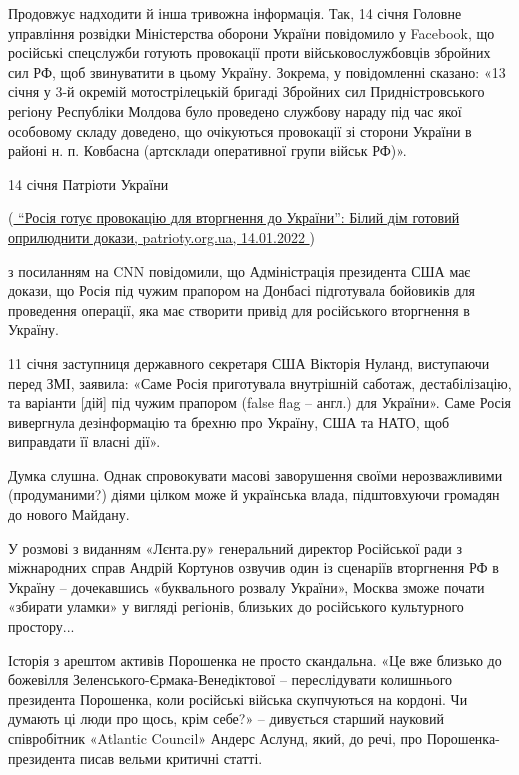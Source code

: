 Продовжує надходити й інша тривожна інформація. Так, 14 січня Головне
управління розвідки Міністерства оборони України повідомило у Facebook, що
російські спецслужби готують провокації проти військовослужбовців збройних сил
РФ, щоб звинуватити в цьому Україну. Зокрема, у повідомленні сказано: «13 січня
у 3-й окремій мотострілецькій бригаді Збройних сил Придністровського регіону
Республіки Молдова було проведено службову нараду під час якої особовому складу
доведено, що очікуються провокації зі сторони України в районі н. п. Ковбасна
(артсклади оперативної групи військ РФ)».

14 січня Патріоти України

(\href{https://patrioty.org.ua/politic/rosiia-hotuie-provokatsiiu-dlia-vtorhnennia-do-ukrainy-bilyi-dim-hotovyi-opryliudnyty-dokazy-406573.html}{
\enquote{Росія готує провокацію для вторгнення до України}: Білий дім готовий оприлюднити докази, patrioty.org.ua, 14.01.2022%
})

з посиланням на CNN повідомили, що Адміністрація президента США має докази, що
Росія під чужим прапором на Донбасі підготувала бойовиків для проведення
операції, яка має створити привід для російського вторгнення в Україну.

11 січня заступниця державного секретаря США Вікторія Нуланд, виступаючи перед
ЗМІ, заявила: «Саме Росія приготувала внутрішній саботаж, дестабілізацію, та
варіанти [дій] під чужим прапором (false flag – англ.) для України». Саме Росія
вивергнула дезінформацію та брехню про Україну, США та НАТО, щоб виправдати її
власні дії».

Думка слушна. Однак спровокувати масові заворушення своїми нерозважливими
(продуманими?) діями цілком може й українська влада, підштовхуючи громадян до
нового Майдану.

У розмові з виданням «Лєнта.ру» генеральний директор Російської ради з
міжнародних справ Андрій Кортунов озвучив один із сценаріїв вторгнення РФ в
Україну – дочекавшись «буквального розвалу України», Москва зможе почати
«збирати уламки» у вигляді регіонів, близьких до російського культурного
простору...


Історія з арештом активів Порошенка не просто скандальна. «Це вже близько до
божевілля Зеленського-Єрмака-Венедіктової – переслідувати колишнього президента
Порошенка, коли російські війська скупчуються на кордоні. Чи думають ці люди
про щось, крім себе?» – дивується старший науковий співробітник «Atlantic
Council» Андерс Аслунд, який, до речі, про Порошенка-президента писав вельми
критичні статті.

